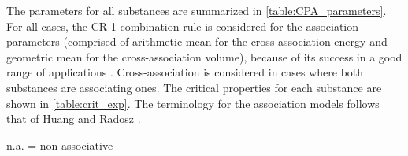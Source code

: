 \documentclass[preprint,12pt,3p]{elsarticle}
\begin{document}
The parameters for all substances are summarized in \cref{table:CPA_parameters}.
For all cases, the \mbox{CR-1} combination rule is considered for the association parameters (comprised of arithmetic mean for the cross-association energy and geometric mean for the cross-association volume), because of its success in a good range of applications \cite{folas2005application,folas2006application,kontogeorgis2006ten1,kontogeorgis2006ten2}.
Cross-association is considered in cases where both substances are associating ones.
The critical properties for each substance are shown in \cref{table:crit_exp}.
The terminology for the association models follows that of Huang and Radosz \cite{huang1990equation}.

\begin{table}[h!]
\centering
\caption{Parameters of the CPA equation of state used in this work.}
\label{table:CPA_parameters}
\raggedright n.a.
= non-associative
\end{table}

\begin{table}[h!]
\centering
\caption{Experimental critical data obtained from NIST database \cite{nistfluids} and used as reference}
\label{table:crit_exp}
\end{table}
\end{document}
